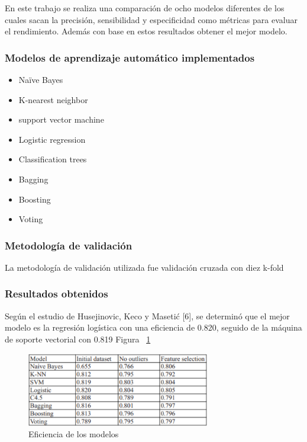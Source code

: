 \documentclass[conference]{IEEEtran}
\begin{document}
En este trabajo se realiza una comparación de ocho modelos diferentes de los cuales sacan la precisión, sensibilidad y especificidad como métricas para evaluar el rendimiento. Además con base en estos resultados  obtener el mejor modelo. \\

\subsubsection{Modelos de aprendizaje automático implementados}
\begin{itemize}
\item Naïve Bayes
\item K-nearest neighbor
\item support vector machine
\item Logistic regression
\item Classification trees
\item Bagging
\item Boosting
\item Voting
\end{itemize}
\hfill
\subsubsection{Metodología de validación}\hfill

La metodología de validación utilizada fue validación cruzada con diez k-fold
\\

\subsubsection{Resultados obtenidos}\hfill

Según el estudio de  Husejinovic, Keco y Masetić [6], se determinó que el mejor modelo es la regresión logística con una eficiencia de 0.820, seguido de la máquina de soporte vectorial con 0.819 Figura ~\ref{fig:Accuracy_4}
\\

\begin{center}
    \begin{figure}[h]
        \hfill
            \includegraphics[width=8cm]{Accuracy_4.png}\hspace*{\fill}
    \caption{Eficiencia de los modelos}
    \label{fig:Accuracy_4}
    \end{figure}
\end{center}
\end{document}
